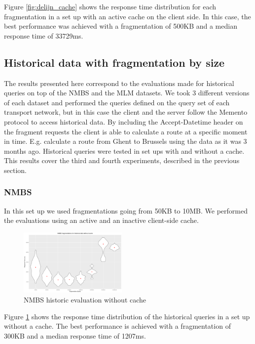 \documentclass[sw]{iosart2x}
\begin{document}
	Figure \ref{fig:delijn_cache} shows the response time distribution for each fragmentation in a set up with an active cache on the client side. In this case, the best performance was achieved with a fragmentation of 500KB and a median response time of 33729ms.
	
	\subsection{Historical data with fragmentation by size}
	The results presented here correspond to the evaluations made for historical queries on top of the NMBS and the MLM datasets. We took 3 different versions of each dataset and performed the queries defined on the query set of each transport network, but in this case the client and the server follow the Memento protocol to access historical data. By including the Accept-Datetime header on the fragment requests the client is able to calculate a route at a specific moment in time. E.g. calculate a route from Ghent to Brussels using the data as it was 3 months ago. Historical queries were tested in set ups with and without a cache. This results cover the third and fourth experiments, described in the previous section.
	
	\subsubsection{NMBS}
	In this set up we used fragmentations going from 50KB to 10MB. We performed the evaluations using an active and an inactive client-side cache.
	
	\begin{figure}[h]
		\includegraphics[width=0.47\textwidth]{nmbs/historic_no_cache.png}
		\caption{NMBS historic evaluation without cache}\label{fig:nmbs_historic_no_cache}
	\end{figure}
	
	Figure \ref{fig:nmbs_historic_no_cache} shows the response time distribution of the historical queries in a set up without a cache. The best performance is achieved with a fragmentation of 300KB and a median response time of 1207ms.
	
\end{document}
